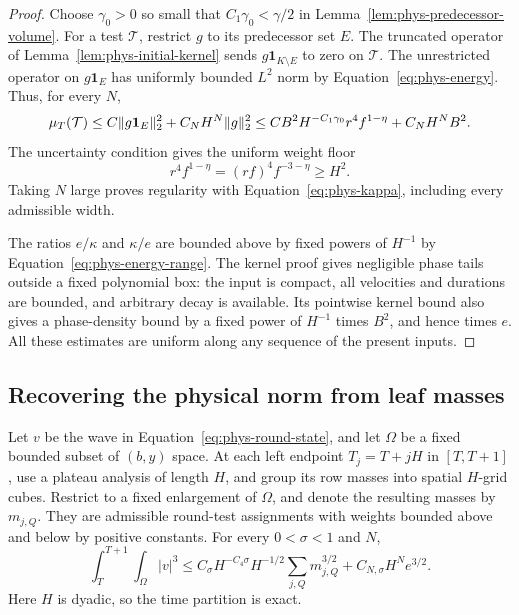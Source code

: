 \begin{proof}
Choose $\gamma_0>0$ so small that $C_1\gamma_0<\gamma/2$ in
Lemma~\ref{lem:phys-predecessor-volume}.  For a test $\mathcal T$,
restrict $g$ to its predecessor set $E$.  The truncated operator
of Lemma~\ref{lem:phys-initial-kernel} sends $g\mathbf1_{K\setminus E}$
to zero on $\mathcal T$.  The unrestricted operator on
$g\mathbf1_E$ has uniformly bounded $L^2$ norm by
Equation~\eqref{eq:phys-energy}.  Thus, for every $N$,
\[
 \mu_T(\mathcal T)
 \le C\lVert g\mathbf1_E\rVert_2^2+C_NH^N\lVert g\rVert_2^2
 \le C B^2H^{-C_1\gamma_0}r^4f^{1-\eta}+C_NH^N B^2.
\]
The uncertainty condition gives the uniform weight floor
\begin{equation}
 r^4f^{1-\eta}=(rf)^4f^{-3-\eta}\ge H^2.
 \label{eq:phys-weight-floor}
\end{equation}
Taking $N$ large proves regularity with
Equation~\eqref{eq:phys-kappa}, including every admissible width.

The ratios $e/\kappa$ and $\kappa/e$ are bounded above by fixed
powers of $H^{-1}$ by Equation~\eqref{eq:phys-energy-range}.
The kernel proof gives negligible phase tails outside a
fixed polynomial box: the input is compact, all velocities and
durations are bounded, and arbitrary decay is available.  Its
pointwise kernel bound also gives a phase-density bound by a fixed
power of $H^{-1}$ times $B^2$, and hence times $e$.  All these
estimates are uniform along any sequence of the present inputs.
\end{proof}

\subsection{Recovering the physical norm from leaf masses}

\begin{lemma}
\label{lem:phys-synthesis}
Let $v$ be the wave in Equation~\eqref{eq:phys-round-state}, and
let $\Omega$ be a fixed bounded subset of $(b,y)$ space.
At each left endpoint $T_j=T+jH$ in $[T,T+1]$, use a plateau
analysis of length $H$, and group its row masses into spatial
$H$-grid cubes.  Restrict to a fixed enlargement of $\Omega$, and
denote the resulting masses by $m_{j,Q}$.  They are admissible
round-test assignments with weights bounded above and below by
positive constants.  For every $0<\sigma<1$ and $N$,
\begin{equation}
 \int_T^{T+1}\int_\Omega |v|^3
 \le C_\sigma H^{-C_4\sigma}H^{-1/2}
                 \sum_{j,Q}m_{j,Q}^{3/2}
       +C_{N,\sigma}H^N e^{3/2}.
 \label{eq:phys-synthesis}
\end{equation}
Here $H$ is dyadic, so the time partition is exact.
\end{lemma}

